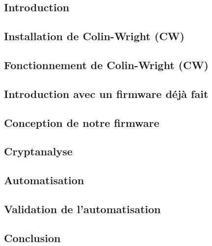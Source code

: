 \subsection{Introduction}
\subsection{Installation de Colin-Wright (CW)}
\subsection{Fonctionnement de Colin-Wright (CW)}
\subsection{Introduction avec un firmware déjà fait}
\subsection{Conception de notre firmware}
\subsection{Cryptanalyse}
\subsection{Automatisation}
\subsection{Validation de l'automatisation}
\subsection{Conclusion}